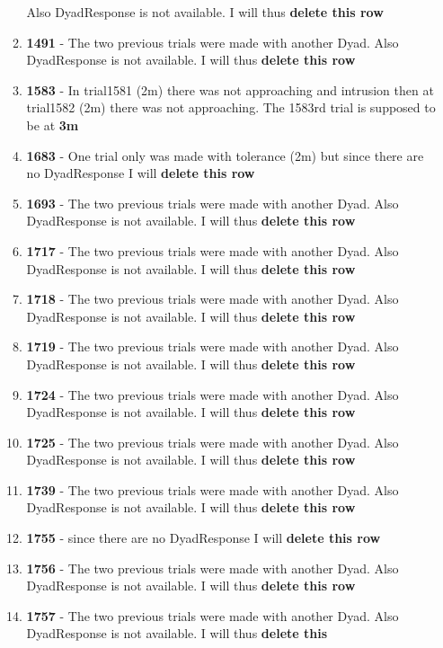 \documentclass[
]{article}
\begin{document}
\begin{itemize}
\begin{enumerate}
    Also DyadResponse is not available. I will thus \textbf{delete this
    row}
  \item
    \textbf{1491} - The two previous trials were made with another Dyad.
    Also DyadResponse is not available. I will thus \textbf{delete this
    row}
  \item
    \textbf{1583} - In trial1581 (2m) there was not approaching and
    intrusion then at trial1582 (2m) there was not approaching. The
    1583rd trial is supposed to be at \textbf{3m}
  \item
    \textbf{1683} - One trial only was made with tolerance (2m) but
    since there are no DyadResponse I will \textbf{delete this row}
  \item
    \textbf{1693} - The two previous trials were made with another Dyad.
    Also DyadResponse is not available. I will thus \textbf{delete this
    row}
  \item
    \textbf{1717} - The two previous trials were made with another Dyad.
    Also DyadResponse is not available. I will thus \textbf{delete this
    row}
  \item
    \textbf{1718} - The two previous trials were made with another Dyad.
    Also DyadResponse is not available. I will thus \textbf{delete this
    row}
  \item
    \textbf{1719} - The two previous trials were made with another Dyad.
    Also DyadResponse is not available. I will thus \textbf{delete this
    row}
  \item
    \textbf{1724} - The two previous trials were made with another Dyad.
    Also DyadResponse is not available. I will thus \textbf{delete this
    row}
  \item
    \textbf{1725} - The two previous trials were made with another Dyad.
    Also DyadResponse is not available. I will thus \textbf{delete this
    row}
  \item
    \textbf{1739} - The two previous trials were made with another Dyad.
    Also DyadResponse is not available. I will thus \textbf{delete this
    row}
  \item
    \textbf{1755} - since there are no DyadResponse I will
    \textbf{delete this row}
  \item
    \textbf{1756} - The two previous trials were made with another Dyad.
    Also DyadResponse is not available. I will thus \textbf{delete this
    row}
  \item
    \textbf{1757} - The two previous trials were made with another Dyad.
    Also DyadResponse is not available. I will thus \textbf{delete this
}
\end{enumerate}
\end{itemize}
\end{document}
